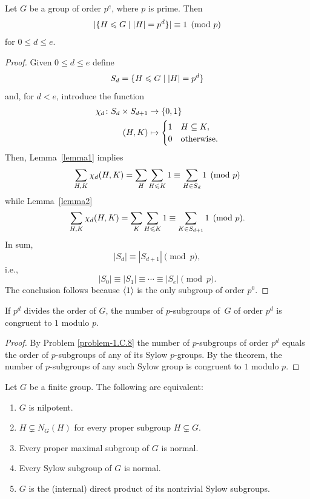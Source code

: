 \begin{thm}
    Let\/ $G$ be a group of order $p^e$, where $p$ is prime. Then
    $$
        |\{H\leqslant G\mid |H|=p^d\}|\equiv1\pmod{p}
    $$
    for\/ $0 \le d \le e$.
\end{thm}

\begin{proof} Given $0\le d\le e$ define
$$
    S_d=\{H \leqslant G\mid \left\vert{H}\right\vert=p^d\}
$$
and, for $d<e$, introduce the function
\begin{align*}
    \chi_d\colon S_d\times S_{d+1}&\to\{0,1\}\\
    (H,K)&\mapsto\begin{cases}
        1   &H\subseteq K,\\
        0   &\text{otherwise}.
    \end{cases}
\end{align*}
Then, Lemma~\ref{lemma1} implies
$$
    \sum_{H,K}\chi_d(H,K) = \sum_H\sum_{H\leqslant K}1
        \equiv\sum_{H\in S_d}1\pmod p
$$
while Lemma~\ref{lemma2}
$$
    \sum_{H,K}\chi_d(H,K) = \sum_K\sum_{H\leqslant K}1
        \equiv\sum_{K\in S_{d+1}}1\pmod p.
$$
In sum,
$$
    |S_d|\equiv|S_{d+1}|\pmod p,
$$
i.e.,
$$
    |S_0|\equiv|S_1|\equiv\cdots\equiv|S_e|\pmod p.
$$
The conclusion follows because $\langle1\rangle$ is the only subgroup of order $p^0$.  \end{proof}

\begin{cor}\label{p-subgroups}
     If\/ $p^d$ divides the order of\/ $G$, the number of\/ $p$-subgroups of\/~$G$ of order\/ $p^d$ is congruent to\/ $1$ modulo\/ $p$.
\end{cor}

\begin{proof} By Problem \ref{problem-1.C.8} the number of $p$-subgroups of order $p^d$ equals the order of $p$-subgroups of any of its Sylow $p$-groups. By the theorem, the number of $p$-subgroups of any such Sylow group is congruent to $1$ modulo $p$.  \end{proof}

\begin{thm}\label{nilpotent-equivalences}
    Let\/ $G$ be a finite group. The following are equivalent:
    \begin{enumerate}[\upshape a)]
        \item $G$ is nilpotent.
        \item $H\varsubsetneq N_G(H)$ for every proper subgroup $H\varsubsetneq G$.
        \item Every proper maximal subgroup of\/ $G$ is normal.
        \item Every Sylow subgroup of\/ $G$ is normal.
        \item $G$ is the (internal) direct product of its nontrivial Sylow subgroups.
    \end{enumerate}
\end{thm}

